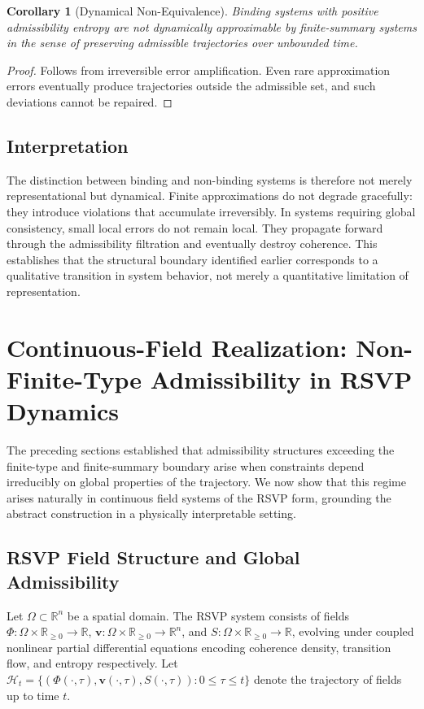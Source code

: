 \documentclass[12pt, a4paper]{article}
\theoremstyle{plain}
\newtheorem{corollary}[theorem]{Corollary}
\theoremstyle{definition}
\theoremstyle{remark}
\begin{document}
\begin{corollary}[Dynamical Non-Equivalence]
Binding systems with positive admissibility entropy are not dynamically approximable by finite-summary systems in the sense of preserving admissible trajectories over unbounded time.
\end{corollary}

\begin{proof}
Follows from irreversible error amplification. Even rare approximation errors eventually produce trajectories outside the admissible set, and such deviations cannot be repaired.
\end{proof}

\subsection{Interpretation}

The distinction between binding and non-binding systems is therefore not merely representational but dynamical. Finite approximations do not degrade gracefully: they introduce violations that accumulate irreversibly. In systems requiring global consistency, small local errors do not remain local. They propagate forward through the admissibility filtration and eventually destroy coherence. This establishes that the structural boundary identified earlier corresponds to a qualitative transition in system behavior, not merely a quantitative limitation of representation.

\section{Continuous-Field Realization: Non-Finite-Type Admissibility in RSVP Dynamics}

The preceding sections established that admissibility structures exceeding the finite-type and finite-summary boundary arise when constraints depend irreducibly on global properties of the trajectory. We now show that this regime arises naturally in continuous field systems of the RSVP form, grounding the abstract construction in a physically interpretable setting.

\subsection{RSVP Field Structure and Global Admissibility}

Let $\Omega \subset \mathbb{R}^n$ be a spatial domain. The RSVP system consists of fields $\Phi : \Omega \times \mathbb{R}_{\ge 0} \to \mathbb{R}$, $\mathbf{v} : \Omega \times \mathbb{R}_{\ge 0} \to \mathbb{R}^n$, and $S : \Omega \times \mathbb{R}_{\ge 0} \to \mathbb{R}$, evolving under coupled nonlinear partial differential equations encoding coherence density, transition flow, and entropy respectively. Let $\mathcal{H}_t = \{(\Phi(\cdot,\tau), \mathbf{v}(\cdot,\tau), S(\cdot,\tau)) : 0 \le \tau \le t\}$ denote the trajectory of fields up to time $t$.
\end{document}
